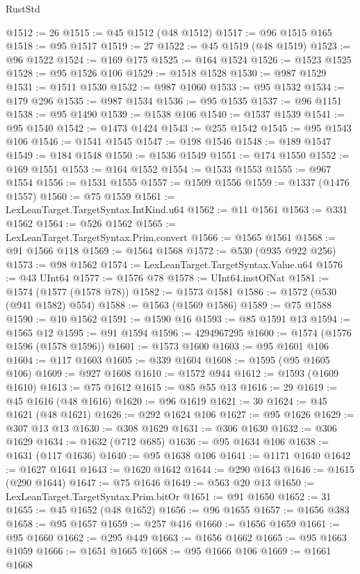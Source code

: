 \begin{lexlean}{RustStd}
\begin{coremodule}
@1512 := 26
@1515 := @45 @1512 (@48 @1512)
@1517 := @96 @1515 @165
@1518 := @95 @1517
@1519 := 27
@1522 := @45 @1519 (@48 @1519)
@1523 := @96 @1522
@1524 := @169 @175
@1525 := @164 @1524
@1526 := @1523 @1525
@1528 := @95 @1526 @106
@1529 := @1518 @1528
@1530 := @987 @1529
@1531 := @1511 @1530
@1532 := @987 @1060
@1533 := @95 @1532
@1534 := @179 @296
@1535 := @987 @1534
@1536 := @95 @1535
@1537 := @96 @1151
@1538 := @95 @1490
@1539 := @1538 @106
@1540 := @1537 @1539
@1541 := @95 @1540
@1542 := @1473 @1424
@1543 := @255 @1542
@1545 := @95 @1543 @106
@1546 := @1541 @1545
@1547 := @198 @1546
@1548 := @189 @1547
@1549 := @184 @1548
@1550 := @1536 @1549
@1551 := @174 @1550
@1552 := @169 @1551
@1553 := @164 @1552
@1554 := @1533 @1553
@1555 := @967 @1554
@1556 := @1531 @1555
@1557 := @1509 @1556
@1559 := @1337 (@1476 @1557)
@1560 := @75 @1559
@1561 := LexLeanTarget.TargetSyntax.IntKind.u64
@1562 := @11 @1561
@1563 := @331 @1562
@1564 := @526 @1562
@1565 := LexLeanTarget.TargetSyntax.Prim.convert
@1566 := @1565 @1561
@1568 := @91 @1566 @118
@1569 := @1564 @1568
@1572 := @530 (@935 @922 @256)
@1573 := @98 @1562
@1574 := LexLeanTarget.TargetSyntax.Value.u64
@1576 := @43 UInt64
@1577 := @1576 @78
@1578 := UInt64.instOfNat
@1581 := @1574 (@1577 (@1578 @78))
@1582 := @1573 @1581
@1586 := @1572 (@530 (@941 @1582) @554)
@1588 := @1563 (@1569 @1586)
@1589 := @75 @1588
@1590 := @10 @1562
@1591 := @1590 @16
@1593 := @85 @1591 @13
@1594 := @1565 @12
@1595 := @91 @1594
@1596 := 4294967295
@1600 := @1574 (@1576 @1596 (@1578 @1596))
@1601 := @1573 @1600
@1603 := @95 @1601 @106
@1604 := @117 @1603
@1605 := @339 @1604
@1608 := @1595 (@95 @1605 @106)
@1609 := @927 @1608
@1610 := @1572 @944
@1612 := @1593 (@1609 @1610)
@1613 := @75 @1612
@1615 := @85 @55 @13
@1616 := 29
@1619 := @45 @1616 (@48 @1616)
@1620 := @96 @1619
@1621 := 30
@1624 := @45 @1621 (@48 @1621)
@1626 := @292 @1624 @106
@1627 := @95 @1626
@1629 := @307 @13 @13
@1630 := @308 @1629
@1631 := @306 @1630
@1632 := @306 @1629
@1634 := @1632 (@712 @685)
@1636 := @95 @1634 @106
@1638 := @1631 (@117 @1636)
@1640 := @95 @1638 @106
@1641 := @1171 @1640
@1642 := @1627 @1641
@1643 := @1620 @1642
@1644 := @290 @1643
@1646 := @1615 (@290 @1644)
@1647 := @75 @1646
@1649 := @563 @20 @13
@1650 := LexLeanTarget.TargetSyntax.Prim.bitOr
@1651 := @91 @1650
@1652 := 31
@1655 := @45 @1652 (@48 @1652)
@1656 := @96 @1655
@1657 := @1656 @383
@1658 := @95 @1657
@1659 := @257 @416
@1660 := @1656 @1659
@1661 := @95 @1660
@1662 := @295 @449
@1663 := @1656 @1662
@1665 := @95 @1663 @1059
@1666 := @1651 @1665
@1668 := @95 @1666 @106
@1669 := @1661 @1668

\end{coremodule}
\end{lexlean}
